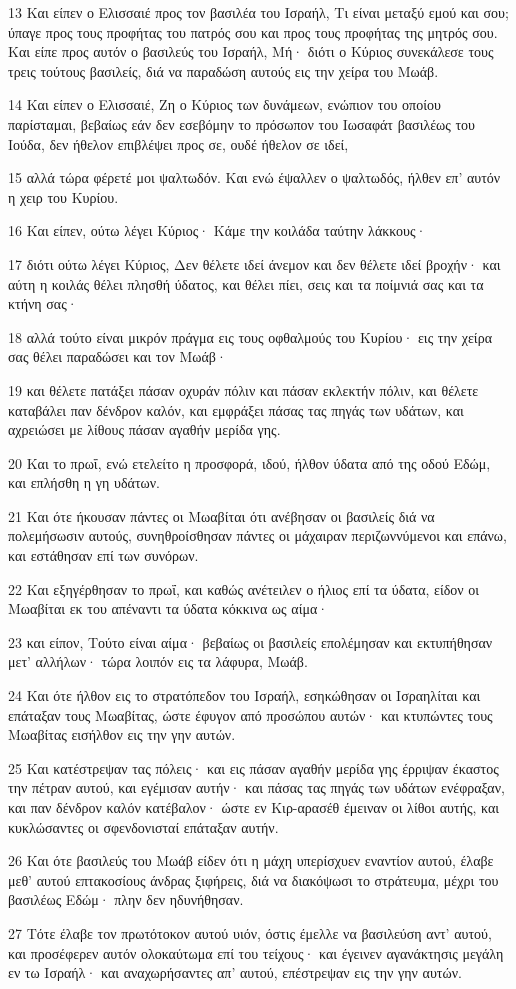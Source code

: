 \par 13 Και είπεν ο Ελισσαιέ προς τον βασιλέα του Ισραήλ, Τι είναι μεταξύ εμού και σου; ύπαγε προς τους προφήτας του πατρός σου και προς τους προφήτας της μητρός σου. Και είπε προς αυτόν ο βασιλεύς του Ισραήλ, Μή· διότι ο Κύριος συνεκάλεσε τους τρεις τούτους βασιλείς, διά να παραδώση αυτούς εις την χείρα του Μωάβ.
\par 14 Και είπεν ο Ελισσαιέ, Ζη ο Κύριος των δυνάμεων, ενώπιον του οποίου παρίσταμαι, βεβαίως εάν δεν εσεβόμην το πρόσωπον του Ιωσαφάτ βασιλέως του Ιούδα, δεν ήθελον επιβλέψει προς σε, ουδέ ήθελον σε ιδεί,
\par 15 αλλά τώρα φέρετέ μοι ψαλτωδόν. Και ενώ έψαλλεν ο ψαλτωδός, ήλθεν επ' αυτόν η χειρ του Κυρίου.
\par 16 Και είπεν, ούτω λέγει Κύριος· Κάμε την κοιλάδα ταύτην λάκκους·
\par 17 διότι ούτω λέγει Κύριος, Δεν θέλετε ιδεί άνεμον και δεν θέλετε ιδεί βροχήν· και αύτη η κοιλάς θέλει πλησθή ύδατος, και θέλει πίει, σεις και τα ποίμνιά σας και τα κτήνη σας·
\par 18 αλλά τούτο είναι μικρόν πράγμα εις τους οφθαλμούς του Κυρίου· εις την χείρα σας θέλει παραδώσει και τον Μωάβ·
\par 19 και θέλετε πατάξει πάσαν οχυράν πόλιν και πάσαν εκλεκτήν πόλιν, και θέλετε καταβάλει παν δένδρον καλόν, και εμφράξει πάσας τας πηγάς των υδάτων, και αχρειώσει με λίθους πάσαν αγαθήν μερίδα γης.
\par 20 Και το πρωΐ, ενώ ετελείτο η προσφορά, ιδού, ήλθον ύδατα από της οδού Εδώμ, και επλήσθη η γη υδάτων.
\par 21 Και ότε ήκουσαν πάντες οι Μωαβίται ότι ανέβησαν οι βασιλείς διά να πολεμήσωσιν αυτούς, συνηθροίσθησαν πάντες οι μάχαιραν περιζωννύμενοι και επάνω, και εστάθησαν επί των συνόρων.
\par 22 Και εξηγέρθησαν το πρωΐ, και καθώς ανέτειλεν ο ήλιος επί τα ύδατα, είδον οι Μωαβίται εκ του απέναντι τα ύδατα κόκκινα ως αίμα·
\par 23 και είπον, Τούτο είναι αίμα· βεβαίως οι βασιλείς επολέμησαν και εκτυπήθησαν μετ' αλλήλων· τώρα λοιπόν εις τα λάφυρα, Μωάβ.
\par 24 Και ότε ήλθον εις το στρατόπεδον του Ισραήλ, εσηκώθησαν οι Ισραηλίται και επάταξαν τους Μωαβίτας, ώστε έφυγον από προσώπου αυτών· και κτυπώντες τους Μωαβίτας εισήλθον εις την γην αυτών.
\par 25 Και κατέστρεψαν τας πόλεις· και εις πάσαν αγαθήν μερίδα γης έρριψαν έκαστος την πέτραν αυτού, και εγέμισαν αυτήν· και πάσας τας πηγάς των υδάτων ενέφραξαν, και παν δένδρον καλόν κατέβαλον· ώστε εν Κιρ-αρασέθ έμειναν οι λίθοι αυτής, και κυκλώσαντες οι σφενδονισταί επάταξαν αυτήν.
\par 26 Και ότε βασιλεύς του Μωάβ είδεν ότι η μάχη υπερίσχυεν εναντίον αυτού, έλαβε μεθ' αυτού επτακοσίους άνδρας ξιφήρεις, διά να διακόψωσι το στράτευμα, μέχρι του βασιλέως Εδώμ· πλην δεν ηδυνήθησαν.
\par 27 Τότε έλαβε τον πρωτότοκον αυτού υιόν, όστις έμελλε να βασιλεύση αντ' αυτού, και προσέφερεν αυτόν ολοκαύτωμα επί του τείχους· και έγεινεν αγανάκτησις μεγάλη εν τω Ισραήλ· και αναχωρήσαντες απ' αυτού, επέστρεψαν εις την γην αυτών.

